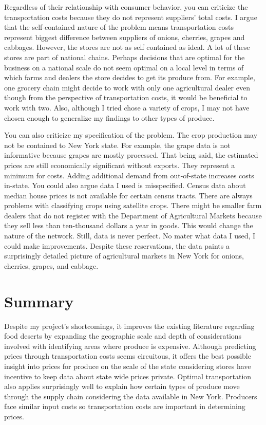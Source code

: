 \documentclass{report}
\begin{document}
Regardless of their relationship with consumer behavior, you can criticize the transportation costs because they do not represent suppliers' total costs. I argue that the self-contained nature of the problem means transportation costs represent biggest difference between suppliers of onions, cherries, grapes and cabbages. However, the stores are not as self contained as ideal. A lot of these stores are part of national chains. Perhaps decisions that are optimal for the business on a national scale do not seem optimal on a local level in terms of which farms and dealers the store decides to get its produce from. For example, one grocery chain might decide to work with only one agricultural dealer even though from the perspective of transportation costs, it would be beneficial to work with two. Also, although I tried chose a variety of crops, I may not have chosen enough to generalize my findings to other types of produce.

You can also criticize my specification of the problem. The crop production may not be contained to New York state. For example, the grape data is not informative because grapes are mostly processed. That being said, the estimated prices are still economically significant without exports. They represent a minimum for costs. Adding additional demand from out-of-state increases costs in-state. You could also argue data I used is misspecified. Census data about median house prices is not available for certain census tracts. There are always problems with classifying crops using satellite crops. There might be smaller farm dealers that do not register with the Department of Agricultural Markets because they sell less than ten-thousand dollars a year in goods. This would change the nature of the network. Still, data is never perfect. No mater what data I used, I could make improvements. Despite these reservations, the data paints a surprisingly detailed picture of agricultural markets in New York for onions, cherries, grapes, and cabbage. 


\section{Summary}

Despite my project's shortcomings, it improves the existing literature regarding food deserts by expanding the geographic scale and depth of considerations involved with identifying areas where produce is expensive. Although predicting prices through transportation costs seems circuitous, it offers the best possible insight into prices for produce on the scale of the state considering stores have incentive to keep data about state wide prices private. Optimal transportation also applies surprisingly well to explain how certain types of produce move through the supply chain considering the data available in New York. Producers face similar input costs so transportation costs are important in determining prices.
\end{document}
